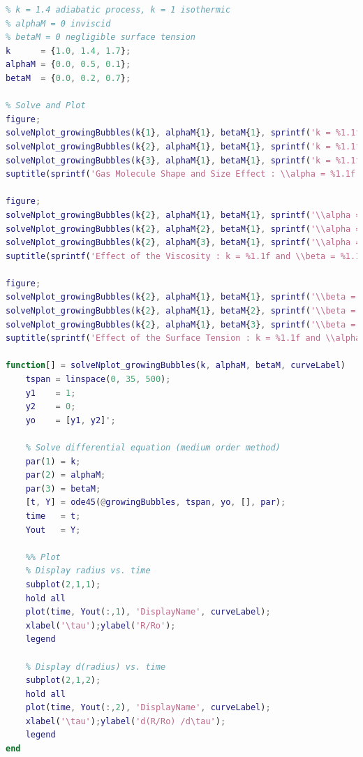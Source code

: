 \documentclass{article}
\begin{document}
\begin{lstlisting}[language=Matlab, caption=Growing Bubbles : Solve and Plot, label=lis:growingBubblesSolveAndPlot]
% Runge-Kutta
% k = 1.4 adiabatic process, k = 1 isothermic
% alphaM = 0 inviscid
% betaM = 0 negligible surface tension
k      = {1.0, 1.4, 1.7};
alphaM = {0.0, 0.5, 0.1};
betaM  = {0.0, 0.2, 0.7};

% Solve and Plot
figure;
solveNplot_growingBubbles(k{1}, alphaM{1}, betaM{1}, sprintf('k = %1.1f', k{1}))
solveNplot_growingBubbles(k{2}, alphaM{1}, betaM{1}, sprintf('k = %1.1f', k{2}))
solveNplot_growingBubbles(k{3}, alphaM{1}, betaM{1}, sprintf('k = %1.1f', k{3}))
suptitle(sprintf('Gas Molecule Shape and Size Effect : \\alpha = %1.1f and \\beta = %1.1f', alphaM{1}, betaM{1}))

figure;
solveNplot_growingBubbles(k{2}, alphaM{1}, betaM{1}, sprintf('\\alpha = %1.1f', alphaM{1}))
solveNplot_growingBubbles(k{2}, alphaM{2}, betaM{1}, sprintf('\\alpha = %1.1f', alphaM{2}))
solveNplot_growingBubbles(k{2}, alphaM{3}, betaM{1}, sprintf('\\alpha = %1.1f', alphaM{3}))
suptitle(sprintf('Effect of the Viscosity : k = %1.1f and \\beta = %1.1f', k{2}, betaM{1}))

figure;
solveNplot_growingBubbles(k{2}, alphaM{1}, betaM{1}, sprintf('\\beta = %1.1f', betaM{1}))
solveNplot_growingBubbles(k{2}, alphaM{1}, betaM{2}, sprintf('\\beta = %1.1f', betaM{2}))
solveNplot_growingBubbles(k{2}, alphaM{1}, betaM{3}, sprintf('\\beta = %1.1f', betaM{3}))
suptitle(sprintf('Effect of the Surface Tension : k = %1.1f and \\alpha = %1.1f', k{2}, alphaM{1}))

function[] = solveNplot_growingBubbles(k, alphaM, betaM, curveLabel)
    tspan = linspace(0, 35, 500);
    y1    = 1;
    y2    = 0;
    yo    = [y1, y2]';

    % Solve differential equation (medium order method)
    par(1) = k;
    par(2) = alphaM;
    par(3) = betaM;
    [t, Y] = ode45(@growingBubbles, tspan, yo, [], par);
    time   = t;
    Yout   = Y;

    %% Plot
    % Display radius vs. time
    subplot(2,1,1);
    hold all
    plot(time, Yout(:,1), 'DisplayName', curveLabel);
    xlabel('\tau');ylabel('R/Ro');
    legend

    % Display d(radius) vs. time
    subplot(2,1,2);
    hold all
    plot(time, Yout(:,2), 'DisplayName', curveLabel);
    xlabel('\tau');ylabel('d(R/Ro) /d\tau');
    legend
end
\end{lstlisting}
\end{document}

